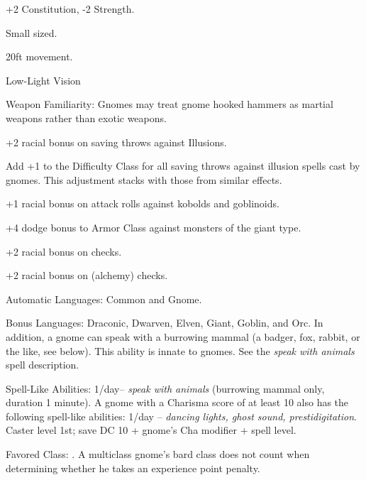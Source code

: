 

\begin{itemize*}
\item +2 Constitution, -2 Strength.
\item Small sized.
\item 20ft movement.
\item Low-Light Vision
\item Weapon Familiarity: Gnomes may treat gnome hooked hammers as martial weapons rather than exotic weapons.
\item +2 racial bonus on saving throws against Illusions.
\item Add +1 to the Difficulty Class for all saving throws against illusion spells cast by gnomes. This adjustment stacks with those from similar effects.
\item +1 racial bonus on attack rolls against kobolds and goblinoids.
\item +4 dodge bonus to Armor Class against monsters of the giant type.
\item +2 racial bonus on  checks.
\item +2 racial bonus on  (alchemy) checks.
\item Automatic Languages: Common and Gnome.
\item Bonus Languages: Draconic, Dwarven, Elven, Giant, Goblin, and Orc. In addition, a gnome can speak with a burrowing mammal (a badger, fox, rabbit, or the like, see below). This ability is innate to gnomes. See the \textit{speak with animals} spell description.
\item Spell-Like Abilities: 1/day-- \textit{speak with animals} (burrowing mammal only, duration 1 minute). A gnome with a Charisma score of at least 10 also has the following spell-like abilities: 1/day -- \textit{dancing lights, ghost sound, prestidigitation}. Caster level 1st; save DC 10 + gnome's Cha modifier + spell level.
\item Favored Class: . A multiclass gnome's bard class does not count when determining whether he takes an experience point penalty.
\end{itemize*}
